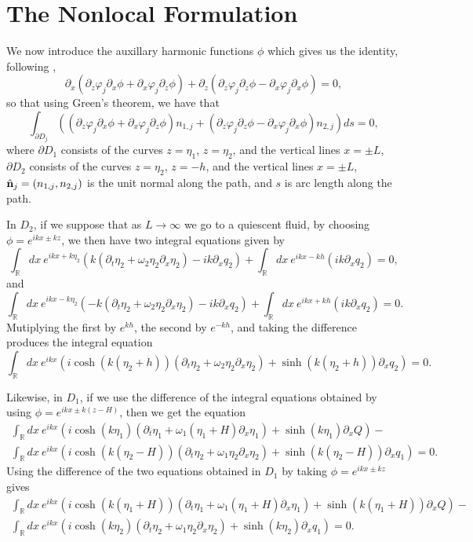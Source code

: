 \documentclass[a4paper,11pt]{article}
\newcommand{\p}{\partial}
\begin{document}
\section{The Nonlocal Formulation}

We now introduce the auxillary harmonic functions $\phi$ which gives us the identity, following \cite{afm}, 
\[
\p_{x}\left(\p_{z}\varphi_{j}\p_{x}\phi + \p_{x}\varphi_{j}\p_{z}\phi \right) + \p_{z}\left(\p_{z}\varphi_{j}\p_{z}\phi - \p_{x}\varphi_{j}\p_{x}\phi \right) = 0,
\]
so that using Green's theorem, we have that 
\[
\int_{\p D_{j}} \left(\left(\p_{z}\varphi_{j}\p_{x}\phi + \p_{x}\varphi_{j}\p_{z}\phi \right)n_{1,j} + \left(\p_{z}\varphi_{j}\p_{z}\phi - \p_{x}\varphi_{j}\p_{x}\phi \right)n_{2,j}\right) ds = 0,
\]
where $\p D_{1}$ consists of the curves $z=\eta_{1}$, $z=\eta_{2}$, and the vertical lines $x=\pm L$, $\p D_{2}$ consists of the curves $z=\eta_{2}$, $z=-h$, and the vertical lines $x=\pm L$, $\hat{{\bf n}}_{j}=(n_{1,j},n_{2,j})$ is the unit normal along the path, and $s$ is arc length along the path.  

In $D_{2}$, if we suppose that as $L\rightarrow \infty$ we go to a quiescent fluid, by choosing $\phi = e^{ikx \pm kz}$, we then have two integral equations given by 
\[
\int_{\mathbb{R}}dx ~ e^{ikx+k\eta_{2}}\left(k(\p_{t}\eta_{2} + \omega_{2}\eta_{2}\p_{x}\eta_{2})-ik\p_{x} q_{2}\right) + \int_{\mathbb{R}}dx~e^{ikx-kh}(ik\p_{x}q_{2}) = 0,
\]
and
\[
\int_{\mathbb{R}}dx ~ e^{ikx-k\eta_{2}}\left(-k(\p_{t}\eta_{2} + \omega_{2}\eta_{2}\p_{x}\eta_{2})-ik\p_{x} q_{2}\right) + \int_{\mathbb{R}}dx~e^{ikx+kh}(ik\p_{x}q_{2}) = 0.
\]
Mutiplying the first by $e^{kh}$, the second by $e^{-kh}$, and taking the difference produces the integral equation  
\[
\int_{\mathbb{R}}dx ~ e^{ikx}\left(i\cosh(k(\eta_{2}+h))(\p_{t}\eta_{2} + \omega_{2}\eta_{2}\p_{x}\eta_{2}) + \sinh(k(\eta_{2}+h))\p_{x} q_{2} \right) = 0.
\]

Likewise, in $D_{1}$, if we use the difference of the integral equations obtained by using $\phi = e^{ikx \pm k(z-H)}$, then we get the equation
\begin{align*}
\int_{\mathbb{R}}dx ~ e^{ikx}\left(i\cosh(k\eta_{1})(\p_{t}\eta_{1} + \omega_{1}(\eta_{1}+H)\p_{x}\eta_{1}) + \sinh(k\eta_{1})\p_{x} Q \right) - \\
\int_{\mathbb{R}}dx ~ e^{ikx}\left(i\cosh(k(\eta_{2}-H))(\p_{t}\eta_{2} + \omega_{1}\eta_{2}\p_{x}\eta_{2}) + \sinh(k(\eta_{2}-H))\p_{x} q_{1} \right) = 0.
\end{align*}
Using the difference of the two equations obtained in $D_{1}$ by taking $\phi = e^{ikx \pm kz}$ gives
\begin{align*}
\int_{\mathbb{R}}dx ~ e^{ikx}\left(i\cosh(k(\eta_{1}+H))(\p_{t}\eta_{1} + \omega_{1}(\eta_{1}+H)\p_{x}\eta_{1}) + \sinh(k(\eta_{1}+H))\p_{x}Q \right) - \\
\int_{\mathbb{R}}dx ~ e^{ikx}\left(i\cosh(k\eta_{2})(\p_{t}\eta_{2} + \omega_{1}\eta_{2}\p_{x}\eta_{2}) + \sinh(k\eta_{2})\p_{x} q_{1} \right) = 0.
\end{align*}
\end{document}
